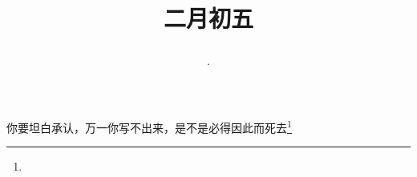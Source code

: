 \title{\date[d=14,m=3,y=2024][year:cn-y,年,month:cn,day:cn,日,·,weekday]·二月初五 }
你要坦白承认，万一你写不出来，是不是必得因此而死去\footnote{ }


